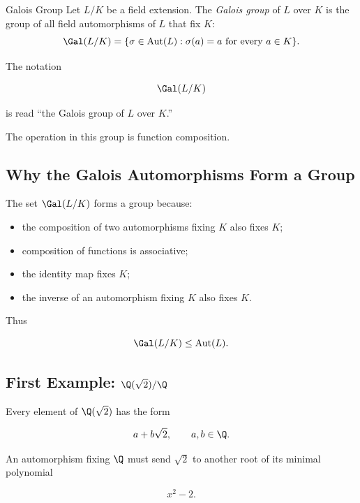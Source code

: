 \begin{definitionbox}{Galois Group}
Let \(L/K\) be a field extension. The \emph{Galois group} of \(L\) over \(K\)
is the group of all field automorphisms of \(L\) that fix \(K\):
\[ \Gal(L/K)=\{\sigma\in\operatorname{Aut}(L):\sigma(a)=a\text{ for every }a\in K\}. \]
\end{definitionbox}

The notation

\[ \Gal(L/K) \]

is read ``the Galois group of \(L\) over \(K\).''

The operation in this group is function composition.

\subsection{Why the Galois Automorphisms Form a Group}
\label{subsec:galois-automorphisms-group}

The set \(\Gal(L/K)\) forms a group because:

\begin{itemize}
    \item the composition of two automorphisms fixing \(K\) also fixes \(K\);
    \item composition of functions is associative;
    \item the identity map fixes \(K\);
    \item the inverse of an automorphism fixing \(K\) also fixes \(K\).
\end{itemize}

Thus

\[ \Gal(L/K)\leq\operatorname{Aut}(L). \]

\subsection{First Example: \(\Q(\sqrt2)/\Q\)}
\label{subsec:galois-q-sqrt2}

Every element of \(\Q(\sqrt2)\) has the form

\[ a+b\sqrt2,\qquad a,b\in\Q. \]

An automorphism fixing \(\Q\) must send \(\sqrt2\) to another root of its
minimal polynomial

\[ x^2-2. \]

